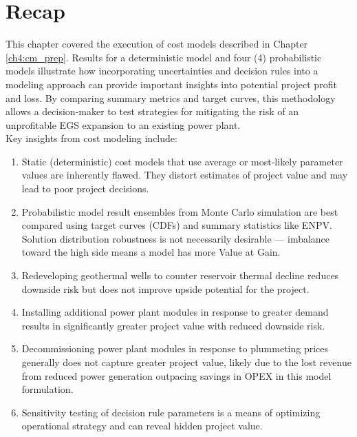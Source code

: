 \section{Recap}\label{ch6:recap}
This chapter covered the execution of cost models described in Chapter \ref{ch4:cm_prep}. Results for a deterministic model and four (4) probabilistic models illustrate how incorporating uncertainties and decision rules into a modeling approach can provide important insights into potential project profit and loss. By comparing summary metrics and target curves, this methodology allows a decision-maker to test strategies for mitigating the risk of an unprofitable EGS expansion to an existing power plant.
\\
Key insights from cost modeling include:
\begin{enumerate}
    \item Static (deterministic) cost models that use average or most-likely parameter values are inherently flawed. They distort estimates of project value and may lead to poor project decisions.
    \item Probabilistic model result ensembles from Monte Carlo simulation are best compared using target curves (CDFs) and summary statistics like ENPV. Solution distribution robustness is not necessarily desirable --- imbalance toward the high side means a model has more Value at Gain.
    \item Redeveloping geothermal wells to counter reservoir thermal decline reduces downside risk but does not improve upside potential for the project.
    \item Installing additional power plant modules in response to greater demand results in significantly greater project value with reduced downside risk.
    \item Decommissioning power plant modules in response to plummeting prices generally does not capture greater project value, likely due to the lost revenue from reduced power generation outpacing savings in OPEX in this model formulation.
    \item Sensitivity testing of decision rule parameters is a means of optimizing operational strategy and can reveal hidden project value.
\end{enumerate}
